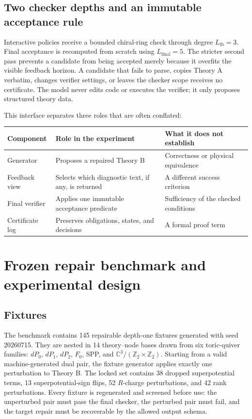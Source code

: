 \documentclass[11pt]{scrartcl}
\begin{document}
\subsection{Two checker depths and an immutable acceptance rule}

Interactive policies receive a bounded chiral-ring check through degree
$L_{\mathrm{fb}}=3$.  Final acceptance is recomputed from scratch using
$L_{\mathrm{final}}=5$.  The stricter second pass prevents a candidate from
being accepted merely because it overfits the visible feedback horizon.  A
candidate that fails to parse, copies Theory A verbatim, changes verifier
settings, or leaves the checker scope receives no certificate.  The model never
edits code or executes the verifier; it only proposes structured theory data.

This interface separates three roles that are often conflated:

\begin{center}
\begin{tabular}{p{}p{}p{}}
\toprule
Component & Role in the experiment & What it does not establish \\
\midrule
Generator & Proposes a repaired Theory B & Correctness or physical equivalence \\
Feedback view & Selects which diagnostic text, if any, is returned & A different success criterion \\
Final verifier & Applies one immutable acceptance predicate & Sufficiency of the checked conditions \\
Certificate log & Preserves obligations, states, and decisions & A formal proof term \\
\bottomrule
\end{tabular}
\end{center}

\section{Frozen repair benchmark and experimental design}
\label{sec:design}

\subsection{Fixtures}

The benchmark contains 145 repairable depth-one fixtures generated with seed
20260715.  They are nested in 14 theory--node bases drawn from six toric-quiver
families: $dP_0$, $dP_1$, $dP_2$, $F_0$, SPP, and
$\mathbb C^3/(\mathbb Z_2\!\times\!\mathbb Z_2)$.  Starting from a valid
machine-generated dual pair, the fixture generator applies exactly one
perturbation to Theory B.  The locked set contains 38 dropped
superpotential terms, 13 superpotential-sign flips, 52 $R$-charge
perturbations, and 42 rank perturbations.  Every fixture is regenerated and
screened before use: the unperturbed pair must pass the final checker, the
perturbed pair must fail, and the target repair must be recoverable by the
allowed output schema.
\end{document}
